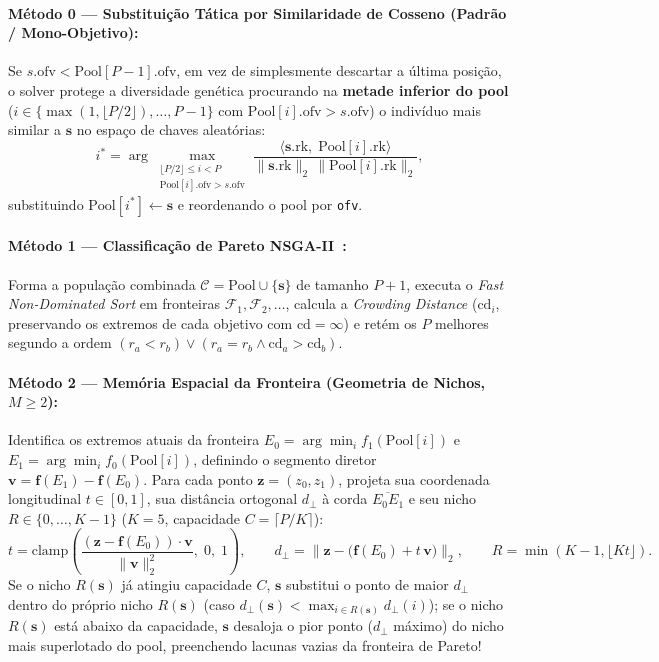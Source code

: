 \documentclass[11pt,a4paper]{article}
\begin{document}
\paragraph{Método 0 --- Substituição Tática por Similaridade de Cosseno (Padrão / Mono-Objetivo):}
Se $s.\text{ofv} < \text{Pool}[P-1].\text{ofv}$, em vez de simplesmente descartar a última posição, o solver protege a diversidade genética procurando na \textbf{metade inferior do pool} ($i \in \{\max(1, \lfloor P/2 \rfloor), \dots, P-1\}$ com $\text{Pool}[i].\text{ofv} > s.\text{ofv}$) o indivíduo mais similar a $\mathbf{s}$ no espaço de chaves aleatórias:
\begin{equation}
  i^* = \arg\max_{\substack{\lfloor P/2 \rfloor \le i < P \\ \text{Pool}[i].\text{ofv} > s.\text{ofv}}}
  \frac{\langle \mathbf{s}.\text{rk},\; \text{Pool}[i].\text{rk} \rangle}{\|\mathbf{s}.\text{rk}\|_2 \, \|\text{Pool}[i].\text{rk}\|_2},
\end{equation}
substituindo $\text{Pool}[i^*] \leftarrow \mathbf{s}$ e reordenando o pool por \texttt{ofv}.

\paragraph{Método 1 --- Classificação de Pareto NSGA-II~\cite{deb2002nsgaii}:}
Forma a população combinada $\mathcal{C} = \text{Pool} \cup \{\mathbf{s}\}$ de tamanho $P+1$, executa o \emph{Fast Non-Dominated Sort} em fronteiras $\mathcal{F}_1, \mathcal{F}_2, \dots$, calcula a \emph{Crowding Distance} ($\text{cd}_i$, preservando os extremos de cada objetivo com $\text{cd} = \infty$) e retém os $P$ melhores segundo a ordem $(r_a < r_b) \lor (r_a = r_b \land \text{cd}_a > \text{cd}_b)$.

\paragraph{Método 2 --- Memória Espacial da Fronteira (Geometria de Nichos, $M \ge 2$):}
Identifica os extremos atuais da fronteira $E_0 = \arg\min_i f_1(\text{Pool}[i])$ e $E_1 = \arg\min_i f_0(\text{Pool}[i])$, definindo o segmento diretor $\mathbf{v} = \mathbf{f}(E_1) - \mathbf{f}(E_0)$. Para cada ponto $\mathbf{z} = (z_0, z_1)$, projeta sua coordenada longitudinal $t \in [0,1]$, sua distância ortogonal $d_\perp$ à corda $\overline{E_0 E_1}$ e seu nicho $R \in \{0, \dots, K-1\}$ ($K=5$, capacidade $C = \lceil P/K \rceil$):
\begin{equation}
  t = \text{clamp}\!\left(\frac{(\mathbf{z} - \mathbf{f}(E_0))\cdot \mathbf{v}}{\|\mathbf{v}\|_2^2},\; 0,\; 1\right),
  \qquad
  d_\perp = \big\|\mathbf{z} - \big(\mathbf{f}(E_0) + t\,\mathbf{v}\big)\big\|_2,
  \qquad
  R = \min(K-1, \lfloor K t \rfloor).
\end{equation}
Se o nicho $R(\mathbf{s})$ já atingiu capacidade $C$, $\mathbf{s}$ substitui o ponto de maior $d_\perp$ dentro do próprio nicho $R(\mathbf{s})$ (caso $d_\perp(\mathbf{s}) < \max_{i \in R(\mathbf{s})} d_\perp(i)$); se o nicho $R(\mathbf{s})$ está abaixo da capacidade, $\mathbf{s}$ desaloja o pior ponto ($d_\perp$ máximo) do nicho mais superlotado do pool, preenchendo lacunas vazias da fronteira de Pareto!
\end{document}
